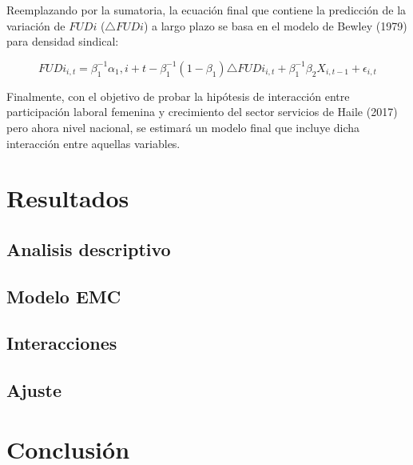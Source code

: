 \documentclass[
]{book}
\begin{document}
Reemplazando por la sumatoria, la ecuación final que contiene la predicción de la variación de \(FUDi\) (\(\triangle FUDi\)) a largo plazo se basa en el modelo de Bewley (1979) para densidad sindical:

\[FUDi_{i,t} = \beta_1^{-1}\alpha_1,i + t- \beta_1^{-1}(1-\beta_1)\triangle FUDi_{i,t}+ \beta_1^{-1}\beta_2X_{i,t-1}+ \epsilon_{i,t}\]

Finalmente, con el objetivo de probar la hipótesis de interacción entre participación laboral femenina y crecimiento del sector servicios de Haile (2017) pero ahora nivel nacional, se estimará un modelo final que incluye dicha interacción entre aquellas variables.

\hypertarget{resultados}{%
\chapter{Resultados}\label{resultados}}

\hypertarget{analisis-descriptivo}{%
\section{Analisis descriptivo}\label{analisis-descriptivo}}

\hypertarget{modelo-emc}{%
\section{Modelo EMC}\label{modelo-emc}}

\hypertarget{interacciones}{%
\section{Interacciones}\label{interacciones}}

\hypertarget{ajuste}{%
\section{Ajuste}\label{ajuste}}

\hypertarget{conclusiuxf3n}{%
\chapter{Conclusión}\label{conclusiuxf3n}}

  
\end{document}
